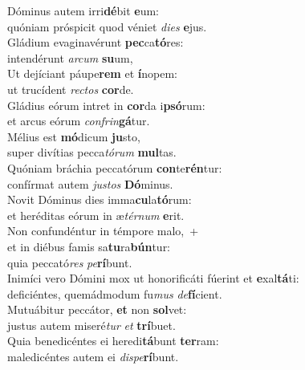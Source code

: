 \oddverse Dóminus autem irri\textbf{dé}bit \textbf{e}um:~\*\\
\oddverse quóniam próspicit quod véniet \textit{di}\textit{es} \textbf{e}jus.\\
\evenverse Gládium evaginavérunt \textbf{pec}ca\textbf{tó}res:~\*\\
\evenverse intendérunt \textit{ar}\textit{cum} \textbf{su}um,\\
\oddverse Ut dejíciant páupe\textbf{rem} et \textbf{í}nopem:~\*\\
\oddverse ut trucídent \textit{re}\textit{ctos} \textbf{cor}de.\\
\evenverse Gládius eórum intret in \textbf{cor}da i\textbf{psó}rum:~\*\\
\evenverse et arcus eórum \textit{con}\textit{frin}\textbf{gá}tur.\\
\oddverse Mélius est \textbf{mó}dicum \textbf{ju}sto,~\*\\
\oddverse super divítias pecca\textit{tó}\textit{rum} \textbf{mul}tas.\\
\evenverse Quóniam bráchia peccatórum \textbf{con}te\textbf{rén}tur:~\*\\
\evenverse confírmat autem \textit{ju}\textit{stos} \textbf{Dó}minus.\\
\oddverse Novit Dóminus dies imma\textbf{cu}la\textbf{tó}rum:~\*\\
\oddverse et heréditas eórum in æ\textit{tér}\textit{num} \textbf{e}rit.\\
\evenverse Non confundéntur in témpore malo,~+\\
\evenverse  et in diébus famis sa\textbf{tu}ra\textbf{bún}tur:~\*\\
\evenverse quia peccató\textit{res} \textit{pe}\textbf{rí}bunt.\\
\oddverse Inimíci vero Dómini mox ut honorificáti fúerint et \textbf{e}xal\textbf{tá}ti:~\*\\
\oddverse deficiéntes, quemádmodum fu\textit{mus} \textit{de}\textbf{fí}cient.\\
\evenverse Mutuábitur peccátor, \textbf{et} non \textbf{sol}vet:~\*\\
\evenverse justus autem miseré\textit{tur} \textit{et} \textbf{trí}buet.\\
\oddverse Quia benedicéntes ei heredi\textbf{tá}bunt \textbf{ter}ram:~\*\\
\oddverse maledicéntes autem ei \textit{di}\textit{spe}\textbf{rí}bunt.\\
